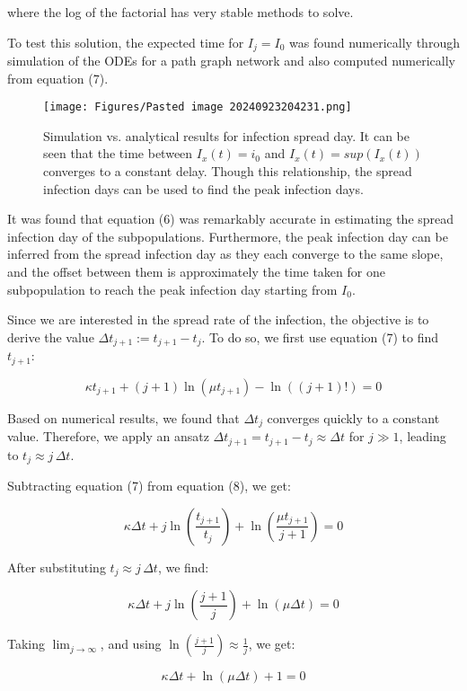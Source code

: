 \documentclass{article}
\begin{document}
where the log of the factorial has very stable methods to solve\cite{C}.

To test this solution, the expected time for $I_j = I_0$ was found numerically through simulation of the ODEs for a path graph network and also computed numerically from equation (7).

\begin{figure}[h!]
    \centering
    \texttt{[image: Figures/Pasted image 20240923204231.png]}
    \caption{\small Simulation vs. analytical results for infection spread day. It can be seen that the time between $I_x(t)=i_0$ and $I_x(t)=sup(I_x(t))$ converges to a constant delay. Though this relationship, the spread infection days can be used to find the peak infection days.}
\end{figure}

It was found that equation (6) was remarkably accurate in estimating the spread infection day of the subpopulations. Furthermore, the peak infection day can be inferred from the spread infection day as they each converge to the same slope, and the offset between them is approximately the time taken for one subpopulation to reach the peak infection day starting from $I_0$.

Since we are interested in the spread rate of the infection, the objective is to derive the value ${\Delta t}_{j+1} := t_{j+1}-t_j$. To do so, we first use equation (7) to find $t_{j+1}$:

$$
\kappa t_{j+1} + (j+1) \ln(\mu t_{j+1}) - \ln((j+1)!) = 0 
$$

Based on numerical results, we found that ${\Delta t}_{j}$ converges quickly to a constant value. Therefore, we apply an ansatz ${\Delta t}_{j+1} = t_{j+1} - t_j \approx {\Delta t}$ for $j \gg 1$, leading to $t_j \approx j \, \Delta t$.

Subtracting equation (7) from equation (8), we get:

$$
\kappa \Delta t + j \ln\left( \frac{t_{j+1}}{t_j} \right) + \ln\left( \frac{\mu t_{j+1}}{j+1} \right) = 0
$$

After substituting $t_j \approx j \, \Delta t$, we find:

$$
\kappa \Delta t + j \ln\left( \frac{j+1}{j} \right) + \ln\left( \mu \Delta t \right) = 0 
$$

Taking $\lim_{j \to \infty}$, and using $\ln\left( \frac{{j+1}}{j} \right) \approx \frac{1}{j}$, we get:

$$
\kappa \Delta t + \ln( \mu \Delta t ) + 1 = 0
$$
\end{document}
